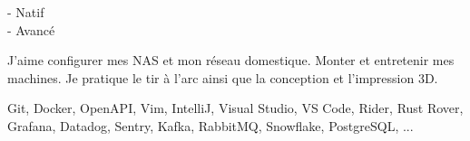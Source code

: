 \documentclass[8pt]{developercv} %
\begin{document}
\vfill %
\begin{minipage}[t]{0.2\textwidth} %
    \vspace{-\baselineskip} %


     - Natif\\
     - Avancé\\
\end{minipage}
\hfill
\begin{minipage}[t]{0.35\textwidth} %
    \vspace{-\baselineskip} %


    J'aime configurer mes NAS et mon réseau domestique. Monter et entretenir mes machines. Je pratique le tir à l'arc ainsi que la conception et l'impression 3D.
\end{minipage}
\hfill
\begin{minipage}[t]{0.35\textwidth} %
    \vspace{-\baselineskip} %


    Git, Docker, OpenAPI, Vim, IntelliJ, Visual Studio, VS Code, Rider, Rust Rover, Grafana, Datadog, Sentry, Kafka, RabbitMQ, Snowflake, PostgreSQL, ...
\end{minipage}

\end{document}
